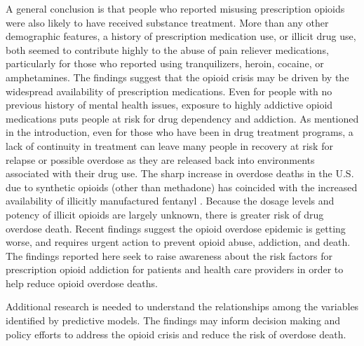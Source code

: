 \documentclass[sigconf]{acmart}
\begin{document}
A general conclusion is that people who reported misusing prescription opioids 
were also likely to have received substance treatment. More than any other 
demographic features, a history of prescription medication use, or illicit drug 
use, both seemed to contribute highly to the abuse of pain reliever medications, 
particularly for those who reported using tranquilizers, heroin, cocaine, or 
amphetamines. The findings suggest that the opioid crisis may be driven by the 
widespread availability of prescription medications. Even for people with no 
previous history of mental health issues, exposure to highly addictive opioid 
medications puts people at risk for drug dependency and addiction. As mentioned 
in the introduction, even for those who have been in drug treatment programs, 
a lack of continuity in treatment can leave many people in recovery at risk 
for relapse or possible overdose as they are released back into environments 
associated with their drug use. The sharp increase in overdose deaths in the 
U.S. due to synthetic opioids (other than methadone) has coincided with the 
increased availability of illicitly manufactured fentanyl \cite{nida17}. 
Because the dosage levels and potency of illicit opioids are largely unknown, 
there is greater risk of drug overdose death. Recent findings suggest the 
opioid overdose epidemic is getting worse, and requires urgent action to prevent 
opioid abuse, addiction, and death. The findings reported here seek to raise 
awareness about the risk factors for prescription opioid addiction for patients 
and health care providers in order to help reduce opioid overdose deaths. 

Additional research 
is needed to understand the relationships among the variables identified by 
predictive models. The findings may inform decision making and policy efforts 
to address the opioid crisis and reduce the risk of overdose death. 


 
\end{document}
